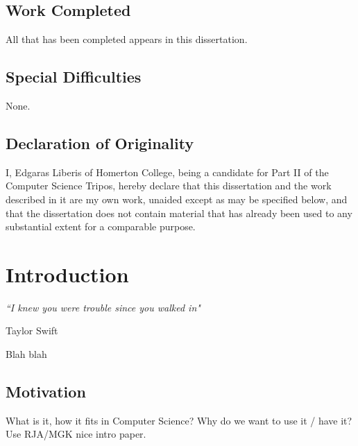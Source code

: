 \documentclass[12pt,british,twoside,notitlepage,usenames,dvipsnames,hypens,final]{report}
\renewcommand\thesubsection{\arabic{subsection}.}
\numberwithin{equation}{section}
\numberwithin{figure}{section}
\newcommand*\circled[1]{\tikz[baseline=(char.base)]{
            \node[shape=circle,draw,inner sep=2pt] (char) {#1};}}
\begin{document}
\section*{Work Completed}

All that has been completed appears in this dissertation.

\section*{Special Difficulties}

None.

\cleardoublepage

\section*{Declaration of Originality}
I, Edgaras Liberis of Homerton College, being a candidate for Part II of the Computer Science Tripos, hereby declare that this dissertation and the work described in it are my own work, unaided except as may be specified below, and that the dissertation does not contain material that has already been used to any substantial extent for a comparable purpose.

\bigskip
{}

\medskip
{}

\newpage

\renewcommand{\thesection}{\arabic{chapter}.\arabic{section}}
\renewcommand{\thesubsection}{\arabic{chapter}.\arabic{section}.\arabic{subsection}}
\setcounter{chapter}{1}
\newcommand{\chapterheader}[2]{%
	\cleardoublepage
	\setcounter{chapter}{#1}
	\setcounter{section}{0}
	\chapter*{\scalebox{2}{\circled{#1}} \:\: #2 \hfill}
}
\setcounter{page}{1}
\pagestyle{headings}

\chapterheader{1}{Introduction}
\epigraph{\emph{``I knew you were trouble since you walked in"}}{Taylor Swift}

Blah blah
 
\section{Motivation}

What is it, how it fits in Computer Science? Why do we want to use it / have it?
Use RJA/MGK nice intro paper.
\end{document}
